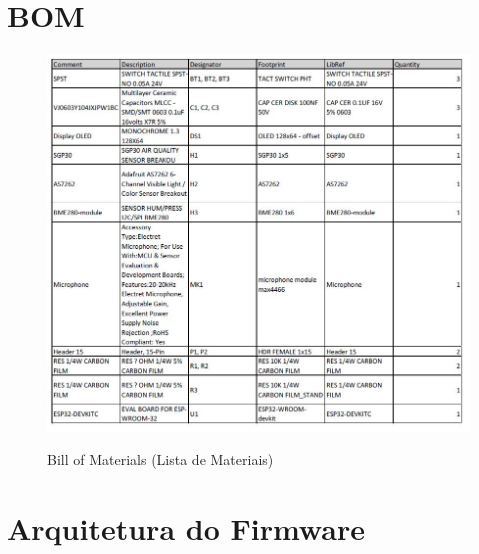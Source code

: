 \documentclass[../monografia.tex]{subfiles}
\begin{document}
\section{BOM}

\begin{figure}[h]
\centering
    \includegraphics[width=.9\textwidth]{bom}
    \label{fig:img1}
    \caption{Bill of Materials (Lista de Materiais)}
\end{figure}

\section{Arquitetura do Firmware}
\end{document}

